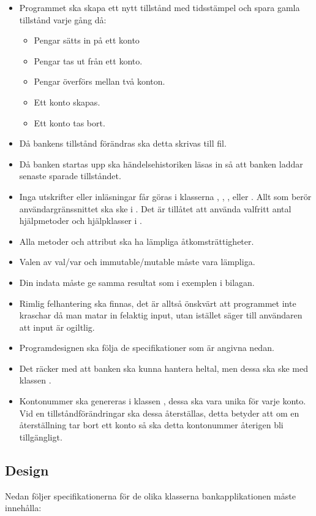 \begin{itemize}
\item Programmet ska skapa ett nytt tillstånd med tidsstämpel och spara gamla tillstånd varje gång då:
\begin{itemize}
\item Pengar sätts in på ett konto
\item Pengar tas ut från ett konto.
\item Pengar överförs mellan två konton.
\item Ett konto skapas.
\item Ett konto tas bort.
\end{itemize}
\item Då bankens tillstånd förändras ska detta skrivas till fil.
\item Då banken startas upp ska händelsehistoriken läsas in så att banken laddar senaste sparade tillståndet.
\item Inga utskrifter eller inläsningar får göras i klasserna , , ,  eller . Allt som berör användargränssnittet ska ske i . Det är tillåtet att använda valfritt antal hjälpmetoder och hjälpklasser i .
\item Alla metoder och attribut ska ha lämpliga åtkomsträttigheter.
\item Valen av val/var och immutable/mutable måste vara lämpliga.
\item Din indata måste ge samma resultat som i exemplen i bilagan.
\item Rimlig felhantering ska finnas, det är alltså önskvärt att programmet inte kraschar då man matar in felaktig input, utan istället säger till användaren att input är ogiltlig.
\item Programdesignen ska följa de specifikationer som är angivna nedan.
\item Det räcker med att banken ska kunna hantera heltal, men dessa ska ske med klassen .
\item Kontonummer ska genereras i klassen , dessa ska vara unika för varje konto. Vid en tillståndförändringar ska dessa återställas, detta betyder att om en återställning tar bort ett konto så ska detta kontonummer återigen bli tillgängligt.
\end{itemize}

\subsection{Design}
Nedan följer specifikationerna för de olika klasserna bankapplikationen måste innehålla:

